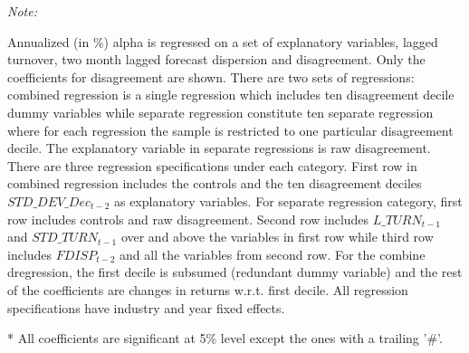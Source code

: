 \begin{landscape}
\begin{table}
\begin{threeparttable}
\begin{tabular}[t]
\bottomrule
\end{tabular}
\begin{tablenotes}
\item \textit{Note: } 
\item Annualized (in \%) \cite{fama_french2015} alpha is regressed on a set of explanatory variables, lagged turnover, two month lagged forecast dispersion and disagreement. Only the coefficients for disagreement are shown. There are two sets of regressions: combined regression is a single regression which includes ten disagreement decile dummy variables while separate regression constitute ten separate regression where for each regression the sample is restricted to one particular disagreement decile. The explanatory variable in separate regressions is raw disagreement. There are three regression specifications under each category. First row in combined regression includes the controls and the ten disagreement deciles $STD\_DEV\_Dec_{t-2}$ as explanatory variables. For separate regression category, first row includes controls and raw disagreement. Second row includes $L\_TURN_{t-1}$ and $STD\_TURN_{t-1}$ over and above the variables in first row while third row includes $FDISP_{t-2}$ and all the variables from second row. For the combine dregression, the first decile is subsumed (redundant dummy variable) and the rest of the coefficients are changes in returns w.r.t. first decile. All regression specifications have industry and year fixed effects.
\item[*] All coefficients are significant at 5\% level except the ones with a trailing '\#'.
\end{tablenotes}
\end{threeparttable}
\end{table}
\end{landscape}
\restoregeometry